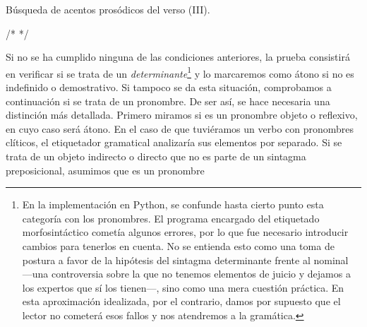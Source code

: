 \begin{algorithm}[!ht]
	\caption{Búsqueda de acentos prosódicos del verso (III).}\label{list:findps3}
		/*  */   
\end{algorithm}

Si no se ha cumplido ninguna de las condiciones anteriores, la prueba consistirá en verificar si se trata de un \textit{determinante}\footnote{En la implementación en Python, se confunde hasta cierto punto esta categoría con los pronombres. El programa encargado del etiquetado morfosintáctico cometía algunos errores, por lo que fue necesario introducir cambios para tenerlos en cuenta. No se entienda esto como una toma de postura a favor de la hipótesis del sintagma determinante \parencite{bernstein2001} frente al nominal —una controversia sobre la que no tenemos elementos de juicio y dejamos a los expertos que sí los tienen—, sino como una mera cuestión práctica. En esta aproximación idealizada, por el contrario, damos por supuesto que el lector no cometerá esos fallos y nos atendremos a la gramática.} y lo marcaremos como átono si no es indefinido o demostrativo. Si tampoco se da esta situación, comprobamos a continuación si se trata de un pronombre. De ser así, se hace necesaria una distinción más detallada. Primero miramos si es un pronombre objeto o reflexivo, en cuyo caso será átono. En el caso de que tuviéramos un verbo con pronombres clíticos, el etiquetador gramatical analizaría sus elementos por separado. Si se trata de un objeto indirecto o directo que no es parte de un sintagma preposicional, asumimos que es un pronombre   

